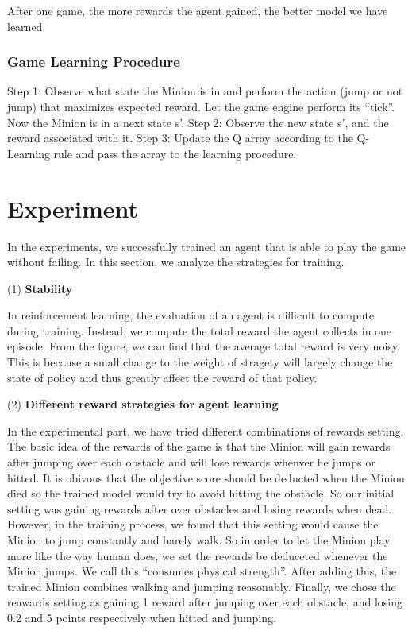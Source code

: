 \documentclass{acmsiggraph}
\begin{document}
After one game, the more rewards the agent gained, the better model we have learned.

\subsubsection{Game Learning Procedure}

Step 1: Observe what state the Minion is in and perform the action (jump or not jump) that maximizes expected reward. Let the game engine perform its “tick”. Now the Minion is in a next state s’.
Step 2: Observe the new state s’, and the reward associated with it.
Step 3: Update the Q array according to the Q-Learning rule and pass the array to the learning procedure.


\section{Experiment}
In the experiments, we successfully trained an agent that is able to play the game without failing. In this section, we analyze the strategies for training.

(1) \textbf{Stability}

In reinforcement learning, the evaluation of an agent is difficult to compute during training. Instead, we compute the total reward the agent collects in one episode. From the figure, we can find that the average total reward is very noisy. This is because a small change to the weight of stragety will largely change the state of policy and thus greatly affect the reward of that policy. 

(2) \textbf{Different reward strategies for agent learning}

In the experimental part, we have tried different combinations of rewards setting. The basic idea of the rewards of the game is that the Minion will gain rewards after jumping over each obstacle and will lose rewards whenver he jumps or hitted. It is obivous that the objective score should be deducted when the Minion died so the trained model would try to avoid hitting the obstacle. So our initial setting was gaining rewards after over obstacles and losing rewards when dead. However, in the training process, we found that this setting would cause the Minion to jump constantly and barely walk. So in order to let the Minion play more like the way human does, we set the rewards be deduceted whenever the Minion jumps. We call this “consumes physical strength”. After adding this, the trained Minion combines walking and jumping reasonably. Finally, we chose the reawards setting as gaining 1 reward after jumping over each obstacle, and losing 0.2 and 5 points respectively when hitted and jumping. 
\end{document}
